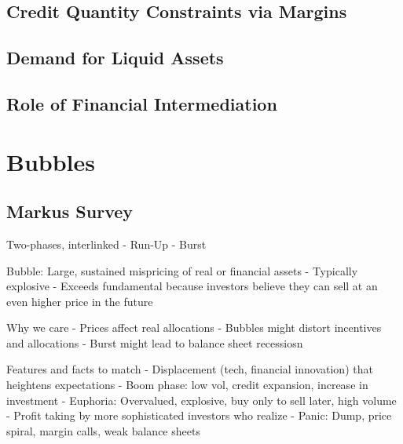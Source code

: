 \documentclass[12pt]{article}
\theoremstyle{plain}
\theoremstyle{definition}
\theoremstyle{remark}
\begin{document}
\subsection{Credit Quantity Constraints via Margins}

\subsection{Demand for Liquid Assets}


\clearpage
\subsection{Role of Financial Intermediation}



\clearpage
\section{Bubbles}

\subsection{Markus Survey}

Two-phases, interlinked
- Run-Up
- Burst

Bubble: Large, sustained mispricing of real or financial assets
- Typically explosive
- Exceeds fundamental because investors believe they can sell at an even
  higher price in the future

Why we care
- Prices affect real allocations
- Bubbles might distort incentives and allocations
- Burst might lead to balance sheet recessiosn

Features and facts to match
- Displacement (tech, financial innovation) that heightens expectations
- Boom phase: low vol, credit expansion, increase in investment
- Euphoria: Overvalued, explosive, buy only to sell later, high volume
- Profit taking by more sophisticated investors who realize
- Panic: Dump, price spiral, margin calls, weak balance sheets
\end{document}
